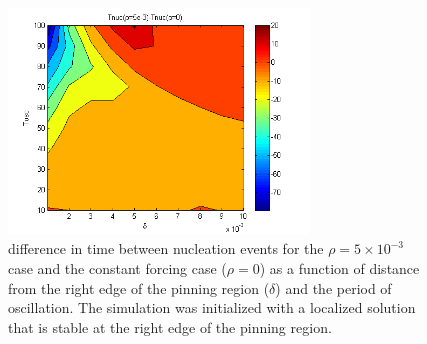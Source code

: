 \documentclass[pre,preprint,superscriptaddress]{revtex4-1}
\begin{document}
\begin{figure}[!htb]\center
\includegraphics[width=80mm]{NucleationTimeOscDiff005.png}
\caption{difference in time between nucleation events for the $\rho=5\times10^{-3}$ case and the constant forcing case ($\rho=0$) as a function of distance from the right edge of the pinning region ($\delta$) and the period of oscillation.  The simulation was initialized with a localized solution that is stable at the right edge of the pinning region.}
    \label{fig:dTnuc}
\end{figure}
\end{document}

